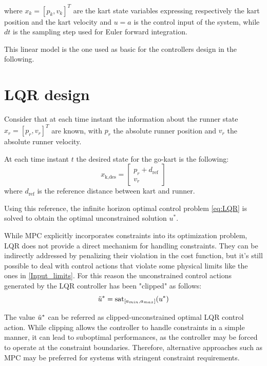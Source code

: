 \documentclass[a4paper,12pt,oneside]{book}
\begin{document}
where $x_k = [p_k , v_k] ^T$  are the kart state variables expressing respectively the kart position and the kart velocity and $u = a$ is the control input of the system, while $dt$ is the sampling step used for Euler forward integration.

This linear model is the one used as basic for the controllers design in the following.

\section{LQR design}
Consider that at each time instant the information about the runner state $x_r =[p_r , v_r] ^T $ are known, with $p_r$ the absolute runner position and $v_r$ the absolute runner velocity.

At each time instant $t$ the desired state for the go-kart is the following:
\begin{equation}
    x_{\text{k,des}} =
    \begin{bmatrix}
        p_r + d_{\text{ref}} \\
        v_r
    \end{bmatrix}
\end{equation}
where $d_{\text{ref}}$ is the reference distance between kart and runner.

\bigskip
Using this reference, the infinite horizon optimal control problem \ref{eq:LQR} is solved to obtain the optimal unconstrained solution $u^*$.

While MPC explicitly incorporates constraints into its optimization problem, LQR does not provide a direct mechanism for handling constraints.
They can be indirectly addressed by penalizing their violation in the cost function, but it's still possible to deal with control actions that violate some physical limits like the ones in \ref{Input_limits}.
For this reason the unconstrained control actions generated by the LQR controller has been "clipped" as follows:
\begin{equation}
    \Tilde{u}^* = \text{sat}_{[a_{min}, a_{max}]} (u^*)
\end{equation}

The value $\Tilde{u}^*$ can be referred as clipped-unconstrained optimal LQR control action.
While clipping allows the controller to handle constraints in a simple manner, it can lead to suboptimal performances, as the controller may be forced to operate at the constraint boundaries.
Therefore, alternative approaches such as MPC may be preferred for systems with stringent constraint requirements.
\end{document}
